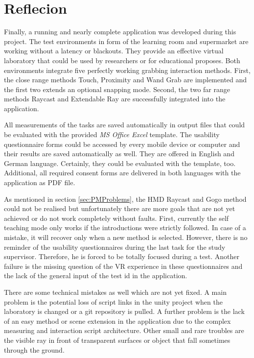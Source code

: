 \section{Reflecion} \label{sec:Reflexion}

Finally, a running and nearly complete application was developed during this project.
The test environments in form of the learning room and supermarket are working without a latency or blackouts. They provide an effective virtual laboratory that could be used by researchers or for educational proposes. Both environments integrate five perfectly working grabbing interaction methods. First, the close range methods Touch, Proximity and Wand Grab are implemented and the first two extends an optional snapping mode. Second, the two far range methods Raycast and Extendable Ray are successfully integrated into the application.
 
All measurements of the tasks are saved automatically in output files that could be evaluated with the provided \textit{MS Office Excel} template. The usability questionnaire forms could be accessed by every mobile device or computer and their results are saved automatically as well. They are offered in English and German language. Certainly, they could be evaluated with the template, too. Additional, all required consent forms are delivered in both languages with the application as PDF file.

As mentioned in section \ref{sec:PMProblems}, the HMD Raycast and Gogo method could not be realised but unfortunately there are more goals that are not yet achieved or do not work completely without faults. First, currently the self teaching mode only works if the introductions were strictly followed. In case of a mistake, it will recover only when a new method is selected. However, there is no reminder of the usability questionnaires during the last task for the study supervisor. Therefore, he is forced to be totally focused during a test. Another failure is the missing question of the VR experience in these questionnaires and the lack of the general input of the test id in the application.

There are some technical mistakes as well which are not yet fixed. A main problem is the potential loss of script links in the unity project when the laboratory is changed or a git repository is pulled. A further problem is the lack of an easy method or scene extension in the application due to the complex measuring and interaction script architecture. Other small and rare troubles are the visible ray in front of transparent surfaces or object that fall sometimes through the ground.

\newpage

























